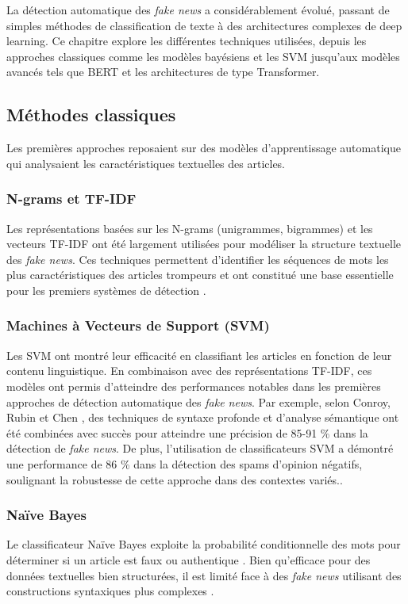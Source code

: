 \documentclass[a4paper,12pt, twocolumn]{article}
\begin{document}
\begin{twocolumn}
La détection automatique des \textit{fake news} a considérablement évolué, passant de simples méthodes de classification de texte à des architectures complexes de deep learning. Ce chapitre explore les différentes techniques utilisées, depuis les approches classiques comme les modèles bayésiens et les SVM jusqu’aux modèles avancés tels que BERT et les architectures de type Transformer.

\subsection{Méthodes classiques}
Les premières approches reposaient sur des modèles d’apprentissage automatique qui analysaient les caractéristiques textuelles des articles.

\subsubsection{N-grams et TF-IDF}
Les représentations basées sur les N-grams (unigrammes, bigrammes) et les vecteurs TF-IDF ont été largement utilisées pour modéliser la structure textuelle des \textit{fake news}. Ces techniques permettent d’identifier les séquences de mots les plus caractéristiques des articles trompeurs et ont constitué une base essentielle pour les premiers systèmes de détection \cite{conroy_automatic_2015}.

\subsubsection{Machines à Vecteurs de Support (SVM)}
Les SVM ont montré leur efficacité en classifiant les articles en fonction de leur contenu linguistique. En combinaison avec des représentations TF-IDF, ces modèles ont permis d’atteindre des performances notables dans les premières approches de détection automatique des \textit{fake news}. Par exemple, selon Conroy, Rubin et Chen \cite{conroy_automatic_2015}, des techniques de syntaxe profonde et d'analyse sémantique ont été combinées avec succès pour atteindre une précision de 85-91 \% dans la détection de \textit{fake news}. De plus, l'utilisation de classificateurs SVM a démontré une performance de 86 \% dans la détection des spams d'opinion négatifs, soulignant la robustesse de cette approche dans des contextes variés.\cite{conroy_automatic_2015}.

\subsubsection{Naïve Bayes}
Le classificateur Naïve Bayes exploite la probabilité conditionnelle des mots pour déterminer si un article est faux ou authentique \cite{alim_al_ayub_ahmed_et_al_detecting_2021}. Bien qu’efficace pour des données textuelles bien structurées, il est limité face à des \textit{fake news} utilisant des constructions syntaxiques plus complexes \cite{conroy_automatic_2015, yang_unsupervised_2019}.


\end{twocolumn}
\end{document}
